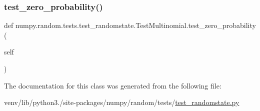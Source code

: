 \subsubsection{\texorpdfstring{test\+\_\+zero\+\_\+probability()}{test\_zero\_probability()}}
{\footnotesize\ttfamily def numpy.\+random.\+tests.\+test\+\_\+randomstate.\+Test\+Multinomial.\+test\+\_\+zero\+\_\+probability (\begin{DoxyParamCaption}\item[{}]{self }\end{DoxyParamCaption})}



The documentation for this class was generated from the following file\+:\begin{DoxyCompactItemize}
\item 
venv/lib/python3./site-\/packages/numpy/random/tests/\hyperlink{test__randomstate_8py}{test\+\_\+randomstate.\+py}\end{DoxyCompactItemize}
